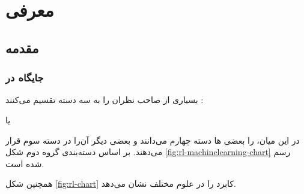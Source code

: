 
\chapter{معرفی }
\section{مقدمه}
\subsection{جایگاه  در }
بسیاری از صاحب نظران  را به سه دسته تقسیم می‌کنند :
\begin{enuminline}
	\item {}
	\item {} یا 
	\item {}
\end{enuminline}

در این میان،
را بعضی ها دسته چهارم می‌دانند و  بعضی دیگر آن‌را در دسته سوم قرار می‌دهند. بر اساس دسته‌بندی گروه دوم شکل 
\ref{fig:rl-machinelearning-chart}
رسم شده است.


همچنین شکل 
\ref{fig:rl-chart}
کابرد  را در علوم مختلف نشان می‌دهد.

